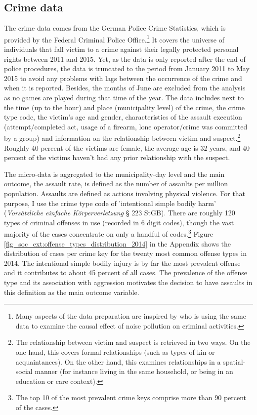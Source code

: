 \subsection{Crime data}
The crime data comes from the German Police Crime Statistics, which is provided by the Federal Criminal Police Office.\footnote{Many aspects of the data preparation are inspired by \cite{hener2019noise} who is using the same data to examine the causal effect of noise pollution on criminal activities.} It covers the universe of individuals that fall victim to a crime against their legally protected personal rights between 2011 and 2015. Yet, as the data is only reported after the end of police procedures, the data is truncated to the period from January 2011 to May 2015 to avoid any problems with lags between the occurrence of the crime and when it is reported. Besides, the months of June are excluded from the analysis as no games are played during that time of the year. The data includes next to the time (up to the hour) and place (municipality level) of the crime, the crime type code, the victim's age and gender, characteristics of the assault execution (attempt/completed act, usage of a firearm, lone operator/crime was committed by a group) and information on the relationship between victim and suspect.\footnote{The relationship between victim and suspect is retrieved in two ways. On the one hand, this covers formal relationships (such as types of kin or acquaintances). On the other hand, this examines relationships in a spatial-social manner (for instance living in the same household, or being in an education or care context).} Roughly 40 percent of the victims are female, the average age is 32 years, and 40 percent of the victims haven't had any prior relationship with the suspect.



The micro-data is aggregated to the municipality-day level and the main outcome, the assault rate, is defined as the number of assaults per million population. Assaults are defined as actions involving physical violence. For that purpose, I use the crime type code of 'intentional simple bodily harm' (\textit{Vorsätzliche einfache Körperverletzung} § 223 StGB). There are roughly 120 types of criminal offenses in use (recorded in 6 digit codes), though the vast majority of the cases concentrate on only a handful of codes.\footnote{The top 10 of the most prevalent crime keys comprise more than 90 percent of the cases.} Figure \ref{fig_soc_ext:offense_types_distribution_2014} in the Appendix shows the distribution of cases per crime key for the twenty most common offense types in 2014. The intentional simple bodily injury is by far the most prevalent offense and it contributes to about 45 percent of all cases. The prevalence of the offense type and its association with aggression motivates the decision to have assaults in this definition as the main outcome variable.

